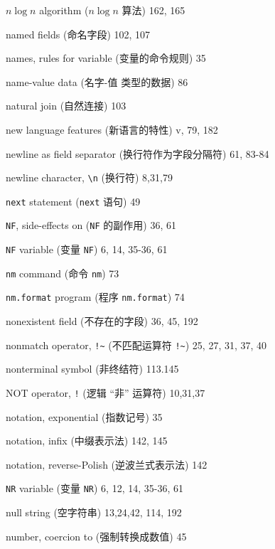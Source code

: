 \begin{multicols}{3}
\hangindent=3pc  $n \log n$ algorithm ($n \log n$ 算法) 162, 165

\hangindent=3pc  named fields (命名字段) 102, 107

\hangindent=3pc  names, rules for variable (变量的命令规则) 35

\hangindent=3pc  name-value data (\mbox{名字}-值 类型的数据) 86

\hangindent=3pc  natural join (自然连接) 103

\hangindent=3pc  new language features (新语言的特性) v, 79, 182

\hangindent=3pc  newline as field separator (换行符作为字段分隔符)
61,  83-84

\hangindent=3pc  newline character, \verb'\n' (换行符) 8,31,79

\hangindent=3pc  \verb'next' statement (\verb'next' 语句) 49

\hangindent=3pc  \verb'NF', side-effects on (\verb'NF'
的副作用) 36, 61

\hangindent=3pc  \verb'NF' variable (变量 \verb'NF') 6, 14, 35-36, 61

\hangindent=3pc  \verb'nm' command (命令 \verb'nm') 73

\hangindent=3pc  \verb'nm.format' program (程序
\verb'nm.format') 74


\hangindent=3pc  nonexistent field (不存在的字段) 36, 45, 192

\hangindent=3pc  nonmatch operator, \verb'!~' (不匹配运算符
\verb'!~') 25, 27, 31, 37, 40

\hangindent=3pc  nonterminal symbol (非终结符) 113.145

\hangindent=3pc  NOT operator, \verb'!' (逻辑 ``非'' 运算符)
10,31,37

\hangindent=3pc  notation, exponential (指数记号) 35

\hangindent=3pc  notation, infix (中缀表示法) 142, 145

\hangindent=3pc  notation, reverse-Polish (逆波兰式表示法) 142

\hangindent=3pc  \verb'NR' variable (变量 \verb'NR')
6, 12, 14, 35-36, 61

\hangindent=3pc  null string (空字符串) 13,24,42, 114, 192

\hangindent=3pc  number, coercion to (强制转换成数值) 45


\end{multicols}
